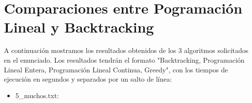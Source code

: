 \section{Comparaciones entre Pogramación Lineal y Backtracking}

A continuación mostramos los resultados obtenidos de los 3 algoritmos solicitados en el enunciado. Los resultados tendrán el formato "Backtracking, Programación Lineal Entera, Programación Lineal Continua, Greedy", con los tiempos de ejecución en segundos y separados por un salto de línea:

\begin{itemize}
    \item 5_muchos.txt: 
\end{itemize}
